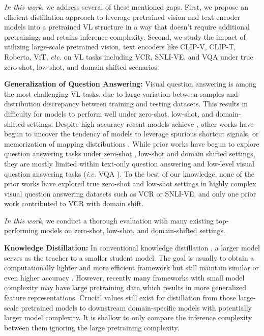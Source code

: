 \documentclass[runningheads]{llncs}
\begin{document}
{\em In this work}, we address several of these mentioned gaps. First, we propose an efficient distillation approach to leverage pretrained vision and text encoder models into a pretrained VL structure in a way that doesn't require additional pretraining, and retains inference complexity. Second, we study the impact of utilizing large-scale pretrained vision, text encoders like CLIP-V, CLIP-T, Roberta, ViT, \textit{etc.} on VL tasks including VCR, SNLI-VE, and VQA under true zero-shot, low-shot, and domain shifted scenarios.



\textbf{Generalization of Question Answering: }Visual question answering \cite{zellers2019vcr,VQA} is among the most challenging VL tasks, due to large variation between samples and distribution discrepancy between training and testing datasets. This results in difficulty for models to perform well under zero-shot, low-shot, and domain-shifted settings. Despite high accuracy recent models achieve \cite{su2019vl,gan2020large,li2020oscar,zhang2021vinvl,zellersluhessel2021merlot}, other works have begun to uncover the tendency of models to leverage spurious shortcut signals, or memorization of mapping distributions \cite{sen2020models,jiang2019avoiding,dancette2021beyond,kovaleva2019revealing}. While prior works have begun to explore question answering tasks under zero-shot \cite{teney2016zero,noh2019transfer}, low-shot \cite{chada2021fewshotqa,brown2020language} and domain shifted \cite{dancette2021beyond,jiang2019avoiding,goyal2017making,zhang2016yin,agrawal2018don,shah2019cycle,ramakrishnan2018overcoming} settings, they are mostly limited within text-only question answering and low-level visual question answering tasks (\textit{i.e.} VQA \cite{VQA}). To the best of our knowledge, none of the prior works have explored true zero-shot and low-shot settings in highly complex visual question answering datasets such as VCR or SNLI-VE, and only one prior work \cite{debias} contributed to VCR with domain shift.



{\em In this work}, we conduct a thorough evaluation with many existing top-performing models on zero-shot, low-shot, and domain-shifted settings.


\textbf{Knowledge Distillation: }
In conventional knowledge distillation \cite{liu2020adaptive,yang2020knowledge,wang2021knowledge,mun2018learning}, a larger model serves as the teacher to a smaller student model. The goal is usually to obtain a computationally lighter and more efficient framework but still maintain similar or even higher accuracy \cite{googleod,cho2021dealing,sanh2019distilbert,jiao2019tinybert,kim2016sequence,sun2019patient}. However, recently many frameworks with small model complexity may have large pretraining data which results in more generalized feature representations. Crucial values still exist for distillation from those large-scale pretrained models to downstream domain-specific models with potentially larger model complexity. It is shallow to only compare the inference complexity between them ignoring the large pretraining complexity.
\end{document}
